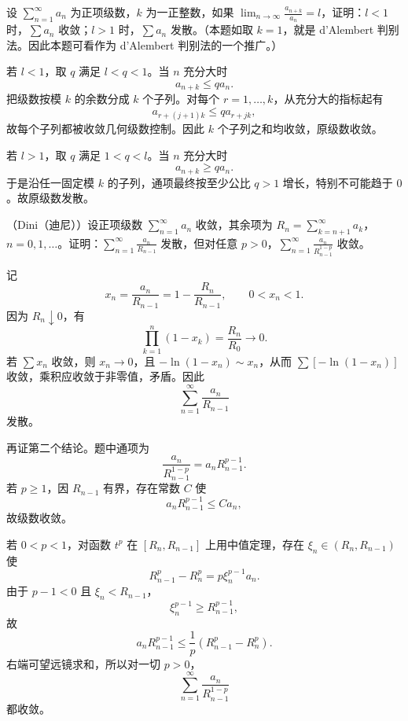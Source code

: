 \begin{xexercise}[13]
设 $\sum_{n=1}^{\infty}a_n$ 为正项级数，$k$ 为一正整数，如果 $\lim_{n\to\infty}\frac{a_{n+k}}{a_n}=l$，证明：$l<1$ 时，$\sum a_n$ 收敛；$l>1$ 时，$\sum a_n$ 发散。（本题如取 $k=1$，就是 d'Alembert 判别法。因此本题可看作为 d'Alembert 判别法的一个推广。）
\end{xexercise}
\begin{xsolution}
若 $l<1$，取 $q$ 满足 $l<q<1$。当 $n$ 充分大时
\[
 a_{n+k}\leq q a_n.
\]
把级数按模 $k$ 的余数分成 $k$ 个子列。对每个 $r=1,\ldots,k$，从充分大的指标起有
\[
 a_{r+(j+1)k}\leq q a_{r+jk},
\]
故每个子列都被收敛几何级数控制。因此 $k$ 个子列之和均收敛，原级数收敛。

若 $l>1$，取 $q$ 满足 $1<q<l$。当 $n$ 充分大时
\[
 a_{n+k}\geq q a_n.
\]
于是沿任一固定模 $k$ 的子列，通项最终按至少公比 $q>1$ 增长，特别不可能趋于 $0$。故原级数发散。
\end{xsolution}


\begin{xexercise}[14]
（Dini（迪尼））设正项级数 $\sum_{n=1}^{\infty}a_n$ 收敛，其余项为 $R_n=\sum_{k=n+1}^{\infty}a_k$，$n=0,1,\ldots$。证明：$\sum_{n=1}^{\infty}\frac{a_n}{R_{n-1}}$ 发散，但对任意 $p>0$，$\sum_{n=1}^{\infty}\frac{a_n}{R_{n-1}^{1-p}}$ 收敛。
\end{xexercise}
\begin{xsolution}
记
\[
 x_n=\frac{a_n}{R_{n-1}}=1-\frac{R_n}{R_{n-1}},
 \qquad 0<x_n<1.
\]
因为 $R_n\downarrow0$，有
\[
 \prod_{k=1}^{n}(1-x_k)=\frac{R_n}{R_0}\longrightarrow0.
\]
若 $\sum x_n$ 收敛，则 $x_n\to0$，且 $-\ln(1-x_n)\sim x_n$，从而 $\sum[-\ln(1-x_n)]$ 收敛，乘积应收敛于非零值，矛盾。因此
\[
 \sum_{n=1}^{\infty}\frac{a_n}{R_{n-1}}
\]
发散。

再证第二个结论。题中通项为
\[
 \frac{a_n}{R_{n-1}^{1-p}}=a_nR_{n-1}^{p-1}.
\]
若 $p\geq1$，因 $R_{n-1}$ 有界，存在常数 $C$ 使
\[
 a_nR_{n-1}^{p-1}\leq Ca_n,
\]
故级数收敛。

若 $0<p<1$，对函数 $t^p$ 在 $[R_n,R_{n-1}]$ 上用中值定理，存在 $\xi_n\in(R_n,R_{n-1})$ 使
\[
 R_{n-1}^p-R_n^p=p\xi_n^{p-1}a_n.
\]
由于 $p-1<0$ 且 $\xi_n<R_{n-1}$，
\[
 \xi_n^{p-1}\geq R_{n-1}^{p-1},
\]
故
\[
 a_nR_{n-1}^{p-1}
 \leq\frac1p(R_{n-1}^p-R_n^p).
\]
右端可望远镜求和，所以对一切 $p>0$，
\[
 \sum_{n=1}^{\infty}\frac{a_n}{R_{n-1}^{1-p}}
\]
都收敛。
\end{xsolution}


